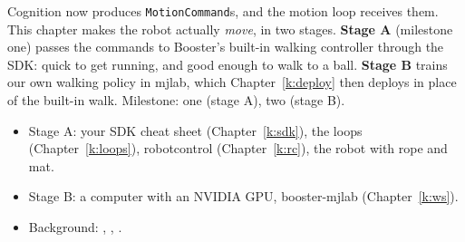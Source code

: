 \label{k:walk}

Cognition now produces \texttt{MotionCommand}s, and the motion loop receives them. This chapter makes the robot actually \emph{move}, in two stages. \textbf{Stage A} (milestone one) passes the commands to Booster's built-in walking controller through the SDK: quick to get running, and good enough to walk to a ball. \textbf{Stage B} trains our own walking policy in mjlab, which Chapter~\ref{k:deploy} then deploys in place of the built-in walk. Milestone: one (stage A), two (stage B).

\begin{needbox}
\begin{itemize}[nosep]
  \item Stage A: your SDK cheat sheet (Chapter~\ref{k:sdk}), the loops (Chapter~\ref{k:loops}), robotcontrol (Chapter~\ref{k:rc}), the robot with rope and mat.
  \item Stage B: a computer with an NVIDIA GPU, booster-mjlab (Chapter~\ref{k:ws}).
  \item Background: , , .
\end{itemize}
\end{needbox}

